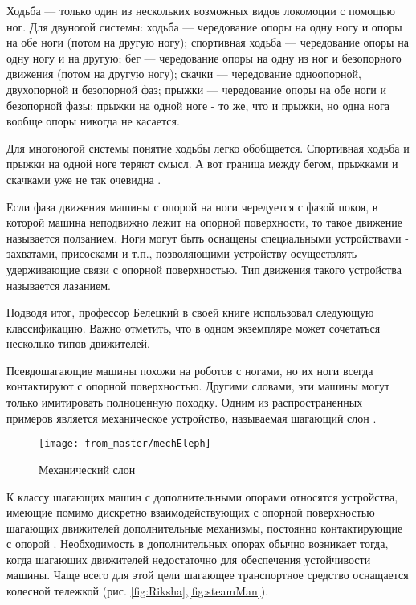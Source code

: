 Ходьба --- только один из нескольких возможных видов локомоции с помощью ног. Для двуногой системы: ходьба --- чередование опоры на одну ногу и опоры на обе ноги (потом на другую ногу); спортивная ходьба --- чередование опоры на одну ногу и на другую; бег --- чередование опоры на одну из ног и безопорного движения (потом на другую ногу); скачки --- чередование одноопорной, двухопорной и безопорной фаз; прыжки --- чередование опоры на обе ноги и безопорной фазы; прыжки на одной ноге - то же, что и прыжки, но одна нога вообще опоры никогда не касается.

Для многоногой системы понятие ходьбы легко обобщается. Спортивная ходьба и прыжки на одной ноге теряют смысл. А вот граница между бегом, прыжками и скачками уже не так очевидна \cite{Bel1984}. 

Если фаза движения машины с опорой на ноги чередуется с фазой покоя, в которой машина неподвижно лежит на опорной поверхности, то такое движение называется ползанием. Ноги могут быть оснащены специальными устройствами - захватами, присосками и т.п., позволяющими устройству осуществлять удерживающие связи с опорной поверхностью. Тип движения такого устройства называется лазанием.

Подводя итог, профессор Белецкий в своей книге использовал следующую классификацию. Важно отметить, что в одном экземпляре может сочетаться несколько типов движителей.

Псевдошагающие машины похожи на роботов с ногами, но их ноги всегда контактируют с опорной поверхностью. Другими словами, эти машины могут только имитировать полноценную походку. Одним из распространенных примеров является механическое устройство, называемая шагающий слон .


\begin{figure}[H]
\centering\texttt{[image: from\_master/mechEleph]}
\caption{Механический слон}
\label{fig:mechEleph}
\end{figure}

К классу шагающих машин с дополнительными опорами относятся устройства, имеющие помимо дискретно взаимодействующих с опорной поверхностью шагающих движителей дополнительные механизмы, постоянно контактирующие с опорой \cite{Maloletov2015dinamica}. Необходимость в дополнительных опорах обычно возникает тогда, когда шагающих движителей недостаточно для обеспечения устойчивости машины. Чаще всего для этой цели шагающее транспортное средство оснащается колесной тележкой (рис. \ref{fig:Riksha},\ref{fig:steamMan})\cite{briskinSintezCiklovogoShagayushchego2011, Petr1986, Brisk2009,2014,2019,Pavl2013}.

